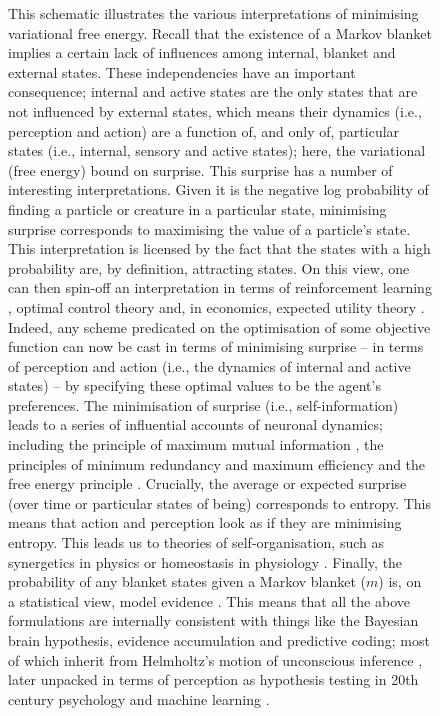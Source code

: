 \documentclass{article}
\begin{document}
\begin{figure}
{This schematic illustrates the various interpretations of minimising variational free energy. Recall that the existence of a Markov blanket implies a certain lack of influences among internal, blanket and external states. These independencies have an important consequence; internal and active states are the only states that are not influenced by external states, which means their dynamics (i.e., perception and action) are a function of, and only of, particular states (i.e., internal, sensory and active states); here, the variational (free energy) bound on surprise. This surprise has a number of interesting interpretations. Given it is the negative log probability of finding a particle or creature in a particular state, minimising surprise corresponds to maximising the value of a particle’s state. This interpretation is licensed by the fact that the states with a high probability are, by definition, attracting states. On this view, one can then spin-off an interpretation in terms of reinforcement learning \cite{bartoReinforcementLearningIntroduction1992}, optimal control theory \cite{todorovOptimalFeedbackControl2002} and, in economics, expected utility theory \cite{bossaertsBehaviouralEconomicsNeuroeconomics2015}. Indeed, any scheme predicated on the optimisation of some objective function can now be cast in terms of minimising surprise -- in terms of perception and action (i.e., the dynamics of internal and active states) -- by specifying these optimal values to be the agent's preferences. The minimisation of surprise (i.e., self-information) leads to a series of influential accounts of neuronal dynamics; including the principle of maximum mutual information \cite{opticanTemporalEncodingTwodimensional1987,linskerPerceptualNeuralOrganization1990}, the principles of minimum redundancy and maximum efficiency \cite{barlowPossiblePrinciplesUnderlying1961} and the free energy principle \cite{fristonFreeEnergyPrinciple2006}. Crucially, the average or expected surprise (over time or particular states of being) corresponds to entropy. This means that action and perception look as if they are minimising entropy. This leads us to theories of self-organisation, such as synergetics in physics \cite{hakenSynergeticsIntroductionNonequilibrium1978,kauffmanOriginsOrderSelforganization1993,nicolisSelforganizationNonequilibriumSystems1977} or homeostasis in physiology \cite{ashbyPrinciplesSelfOrganizingDynamic1947,bernardLecturesPhenomenaLife1974,conantEveryGoodRegulator1970}. Finally, the probability of any blanket states given a Markov blanket ($m$) is, on a statistical view, model evidence \cite{mackayInformationTheoryInference2003,mackayFreeEnergyMinimization1995}. This means that all the above formulations are internally consistent with things like the Bayesian brain hypothesis, evidence accumulation and predictive coding; most of which inherit from Helmholtz's motion of unconscious inference \cite{helmholtzHelmholtzTreatisePhysiological1962}, later unpacked in terms of perception as hypothesis testing in 20th century psychology \cite{gregoryPerceptionsHypotheses1980} and machine learning \cite{dayanHelmholtzMachine1995}.}
    \label{fig: VFE interpretations}
\end{figure}
\end{document}
